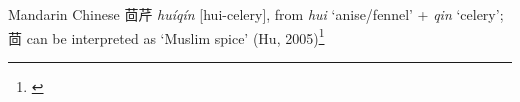 \begin{etymology}\label{ety:huiqin}
Mandarin Chinese {茴芹} \textit{huíqín} [hui-celery], from \textit{hui} `anise/fennel' + \textit{qin} `celery'; 茴 can be interpreted as `Muslim spice' (Hu, 2005)\footnote{\textcite{kleeman_oxford_2010}}
\end{etymology}